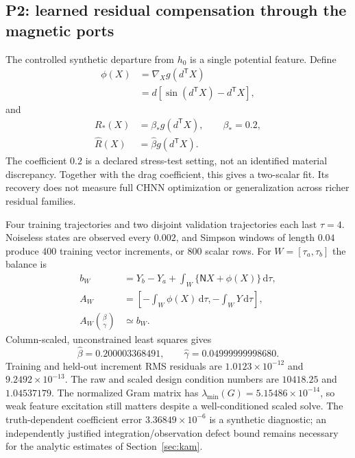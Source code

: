 \subsection{P2: learned residual compensation through the magnetic ports}
\label{num:p2}
\label{num:route-a}
The controlled synthetic departure from $h_0$ is a single potential
feature. Define
\begin{equation}
 \begin{split}
 \phi(X)&=\nabla_X g(d^{\mathsf T}X)\\
        &=d[\sin(d^{\mathsf T}X)-d^{\mathsf T}X],
 \end{split}
 \label{num:feature-gradient}
\end{equation}
and
\begin{equation}
 \begin{split}
 R_*(X)&=\beta_*g(d^{\mathsf T}X),\qquad \beta_*=0.2,\\
 \widehat R(X)&=\widehat\beta g(d^{\mathsf T}X).
 \end{split}
 \label{num:feature}
\end{equation}
The coefficient $0.2$ is a declared stress-test setting, not an identified
material discrepancy. Together with the drag coefficient, this gives a
two-scalar fit. Its recovery does not measure full CHNN optimization or
generalization across richer residual families.

\label{num:identification}
Four training trajectories and two disjoint validation trajectories each
last $\tau=4$. Noiseless states are observed every $0.002$, and Simpson
windows of length $0.04$ produce $400$ training vector increments,
or $800$ scalar rows. For $W=[\tau_a,\tau_b]$ the balance is
\begin{equation}
 \begin{split}
 b_W&=Y_b-Y_a+\int_W\{\mathsf NX+\phi(X)\}\,\mathrm d\tau,\\
 A_W&=\left[-\int_W\phi(X)\,\mathrm d\tau,
                 -\int_WY\,\mathrm d\tau\right],\\
 A_W\binom{\beta}{\gamma}&\simeq b_W.
 \end{split}
 \label{num:regression}
\end{equation}
Column-scaled, unconstrained least squares gives
\begin{equation}
 \widehat\beta=0.200003368491,\qquad
 \widehat\gamma=0.04999999998680.
 \label{num:fitted-values}
\end{equation}
Training and held-out increment RMS residuals are $1.0123\times10^{-12}$ and
$9.2492\times10^{-13}$. The raw and scaled design condition numbers are
$10418.25$ and $1.04537179$. The normalized Gram matrix has
$\lambda_{\min}(G)=5.15486\times10^{-14}$, so weak feature excitation still
matters despite a well-conditioned scaled solve. The truth-dependent
coefficient error $3.36849\times10^{-6}$ is a synthetic diagnostic; an
independently justified integration/observation defect bound remains
necessary for the analytic estimates of Section~\ref{sec:kam}.

